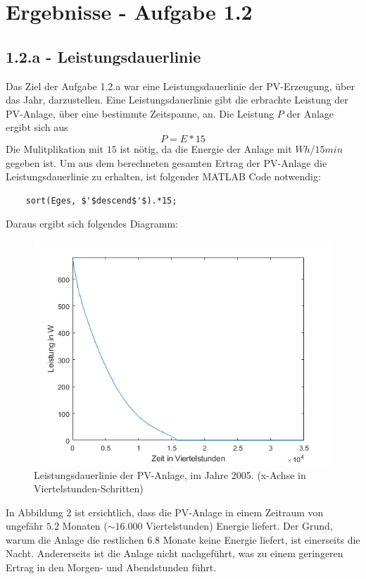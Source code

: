 \documentclass[a4paper,12pt]{article}
\begin{document}
	\section{Ergebnisse - Aufgabe 1.2}
	\subsection{1.2.a - Leistungsdauerlinie}
	Das Ziel der Aufgabe 1.2.a war eine Leistungsdauerlinie der PV-Erzeugung, über das Jahr, darzustellen.\newline
	Eine Leistungsdauerlinie gibt die erbrachte Leistung der PV-Anlage, über eine bestimmte Zeitspanne, an.\newline
	Die Leistung $P$ der Anlage ergibt sich aus
	\begin{equation}
	P=E*15
	\end{equation}
	Die Mulitplikation mit $15$ ist nötig, da die Energie der Anlage mit $Wh/15min$ gegeben ist.\newline
	Um aus dem berechneten gesamten Ertrag der PV-Anlage die Leistungsdauerlinie zu erhalten, ist folgender MATLAB Code notwendig:
	\begin{lstlisting}
	sort(Eges, $'$descend$'$).*15;
	\end{lstlisting}
	\newpage
	Daraus ergibt sich folgendes Diagramm:
	\begin{figure}[H]
		\centering
		\includegraphics[width=12cm]{img/results/Leistungsdauerlinie}
		\caption{Leistungsdauerlinie der PV-Anlage, im Jahre 2005. (x-Achse in Viertelstunden-Schritten)}
	\end{figure}
	In Abbildung 2 ist ersichtlich, dass die PV-Anlage in einem Zeitraum von ungefähr $5.2$ Monaten ($\sim 16.000$ Viertelstunden) Energie liefert. Der Grund, warum die Anlage die restlichen $6.8$ Monate keine Energie liefert, ist einerseits die Nacht. Andererseits ist die Anlage nicht nachgeführt, was zu einem geringeren Ertrag in den Morgen- und Abendstunden führt.
\end{document}
